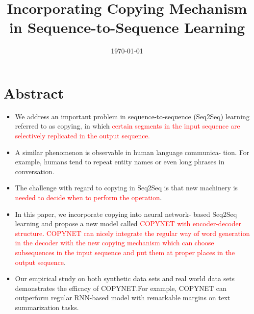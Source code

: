 \documentclass[UTF8]{ctexart}
\title{Incorporating Copying Mechanism in Sequence-to-Sequence Learning}
\date{\today}
\begin{document}
    \maketitle
    \section{Abstract}
    \begin{itemize}
    \item  We address an important problem in sequence-to-sequence (Seq2Seq) learning
    referred to as copying, in which \textcolor{red}{certain segments in the input sequence are
    selectively replicated in the output sequence. }
    \item A similar phenomenon is observable in human language communica-
    tion. For example, humans tend to repeat entity names or even long phrases
    in conversation.
    \item The challenge with regard to copying in Seq2Seq is that new
    machinery is \textcolor{red}{needed to decide when to
    perform the operation}.
    \item In this paper, we incorporate copying into neural network-
    based Seq2Seq learning and propose a new
    model called \textcolor{red}{COPYNET with encoder-decoder structure. COPYNET can nicely
    integrate the regular way of word generation in the decoder with the new copying mechanism which can choose subsequences in the input sequence and put
    them at proper places in the output sequence}.
    \item Our empirical study on both synthetic data sets and real world data sets
    demonstrates the efficacy of COPYNET.For example, COPYNET can outperform
    regular RNN-based model with remarkable margins on text summarization tasks.
    \end{itemize}
\end{document}
